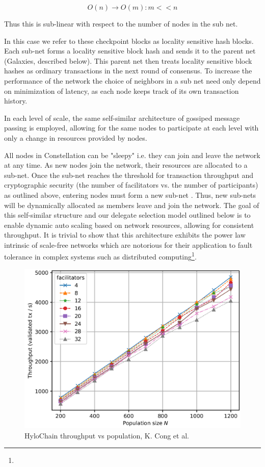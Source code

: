 \documentclass{article}
\begin{document}
\begin{equation}
O(n) \rightarrow O(m) : m<<n
\end{equation}

Thus this is sub-linear with respect to the number of nodes in the sub net. 

In this case we refer to these checkpoint blocks as locality sensitive hash blocks. Each sub-net forms a locality sensitive block hash and sends it to the parent net (Galaxies, described below). This parent net then treats locality sensitive block hashes as ordinary transactions in the next round of consensus. To increase the performance of the network the choice of neighbors in a sub net need only depend on minimization of latency, as each node keeps track of its own transaction history.

In each level of scale, the same self-similar architecture of gossiped message passing is employed, allowing for the same nodes to participate at each level with only a change in resources provided by nodes.

All nodes in Constellation can be  "sleepy" i.e. they can join and leave the network at any time. As new nodes join the network, their resources are allocated to a sub-net. Once the sub-net reaches the threshold for transaction throughput and cryptographic security (the number of facilitators vs. the number of participants) as outlined above, entering nodes must form a new sub-net . Thus, new sub-nets will be dynamically allocated as members leave and join the network. The goal of this self-similar structure and our delegate selection model outlined below is to enable dynamic auto scaling based on network resources, allowing for consistent throughput. It is trivial to show that this architecture exhibits the power law intrinsic of scale-free networks which are notorious for their application to fault tolerance in complex systems such as distributed computing\footnote{}. 

\begin{figure}[H]
\centering
\includegraphics[scale=0.45]{hylochain-throughput-graph}
\caption{HyloChain throughput vs population, K. Cong et al.}
\end{figure} 
\end{document}
